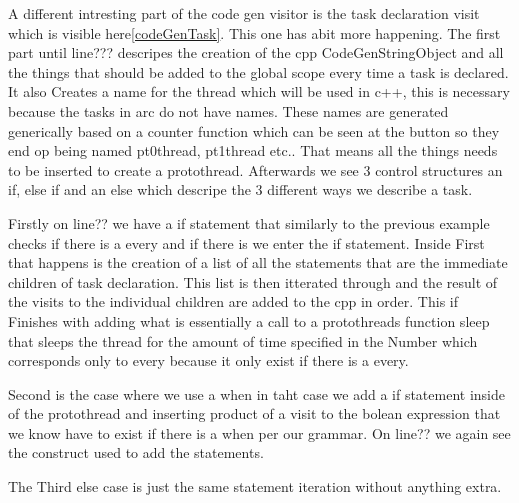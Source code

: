 A different intresting part of the code gen visitor is the task declaration visit which is visible here\ref{codeGenTask}. 
This one has abit more happening. The first part until line??? descripes the creation of the cpp CodeGenStringObject and all the things that should be added to the global scope every time a task is declared. It also Creates a name for the thread which will be used in c++, this is necessary because the tasks in arc do not have names. These names are generated generically based on a counter function which can be seen at the button so they end op being named pt0thread, pt1thread etc..
That means all the things needs to be inserted to create a protothread. Afterwards we see 3 control structures an if, else if and an else which descripe the 3 different ways we describe a task.

Firstly on line?? we have a if statement that similarly to the previous example checks if there is a every and if there is we enter the if statement. Inside First that happens is the creation of a list of all the statements that are the immediate children of task declaration. This list is then itterated through and the result of the visits to the individual children are added to the cpp in order. This if Finishes with adding what is essentially a call to a protothreads function sleep that sleeps the thread for the amount of time specified in the Number which corresponds only to every because it only exist if there is a every.

Second is the case where we use a when in taht case we add a if statement inside of the protothread and inserting product of a visit to the bolean expression that we know have to exist if there is a when per our grammar. On line?? we again see the construct used to add the statements.  

The Third else case is just the same statement iteration without anything extra. 


